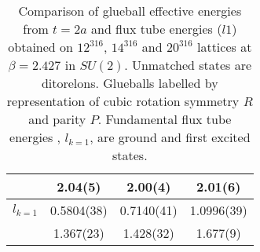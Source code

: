 \documentclass[12pt]{article}
\begin{document}
\begin{table}[htb]
\begin{tabular}{|c|c|c|c|}
           &  2.04(5)    & 2.00(4)   & 2.01(6)  \\ \hline
$l_{k=1}$   & 0.5804(38)   & 0.7140(41) & 1.0996(39)  \\
           & 1.367(23)    & 1.428(32)  & 1.677(9)  \\ \hline
\end{tabular}
\caption{Comparison of glueball  effective energies from $t=2a$ and flux tube energies ($l1$)
  obtained on $12^316$, $14^316$  and $20^316$ lattices at $\beta=2.427$ in $SU(2)$.
  Unmatched states are ditorelons.
  Glueballs labelled by representation of cubic rotation symmetry $R$ and parity $P$.
  Fundamental flux tube energies , $l_{k=1}$, are ground and first excited states.}
\label{table_GvsV_SU2}
\end{table}



\clearpage


\end{document}
